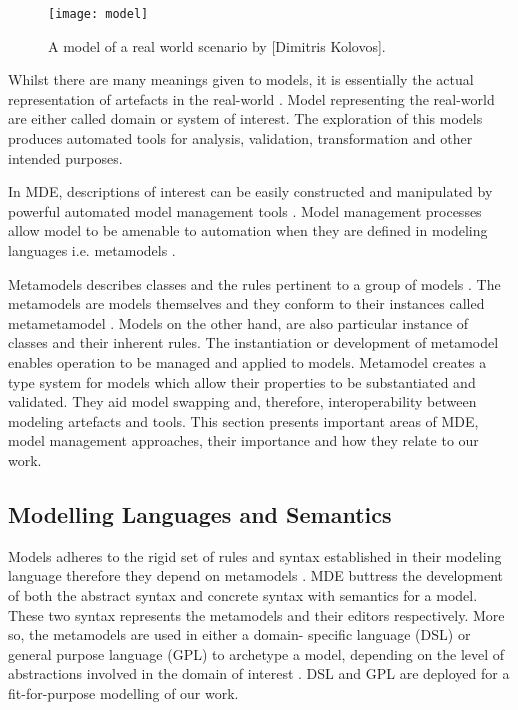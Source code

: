 \documentclass[12pt, a4paper]{report}
\begin{document}
\begin{figure}[!ht]
  \centering
   \texttt{[image: model]}
  \caption{A model of a real world scenario by [Dimitris Kolovos].}
  \label{fig:mrad}
\end{figure}


Whilst there are many meanings given to models, it is essentially the actual representation of artefacts in the real-world \cite{Kurtev2004}. Model representing the real-world are either called domain or system of interest. The exploration of this models produces automated tools for analysis, validation, transformation and other intended purposes.

In MDE, descriptions of interest can be easily constructed and manipulated by powerful automated model management tools \cite{Paige2016}. Model management processes allow model to be amenable to automation when they are defined in modeling languages i.e. metamodels \cite{paige2014}.

Metamodels describes classes and the rules pertinent to a group of models \cite{Paige2016}. The metamodels are models themselves and they conform to their instances called metametamodel \cite{Paige2016}. Models on the other hand, are also particular instance of classes and their inherent rules. The instantiation or development of metamodel enables operation to be managed and applied to models. Metamodel creates a type system for models which allow their properties to be substantiated and validated. They aid model swapping and, therefore, interoperability between modeling artefacts and tools. This section presents important areas of MDE, model management approaches, their importance and how they relate to our work. 

\subsection{Modelling Languages and Semantics} \label{semantics}
Models adheres to the rigid set of rules and syntax established in their modeling language therefore they depend on metamodels \cite{Rose2011}. MDE buttress the development of both the abstract syntax and concrete syntax with semantics for a model. These two syntax represents the metamodels and their editors respectively. More so, the metamodels are used in either a domain- specific language (DSL) or general purpose language (GPL) to archetype a model, depending on the level of abstractions involved in the domain of interest \cite{Rose2011}. DSL and GPL are deployed for a fit-for-purpose modelling of our work.
\end{document}
